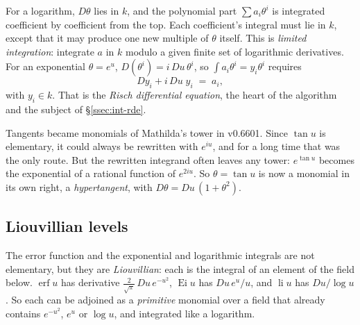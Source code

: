 For a logarithm, \(D\theta\) lies in \(k\), and the polynomial part
\(\sum a_i\theta^i\) is integrated coefficient by coefficient from the top. Each
coefficient's integral must lie in \(k\), except that it may produce one new
multiple of \(\theta\) itself. This is \emph{limited integration}: integrate \(a\) in \(k\) modulo a given finite set of logarithmic
derivatives. For an exponential \(\theta = e^u\), \(D(\theta^i)=i\,Du\,\theta^i\),
so \(\int a_i\theta^i = y_i\theta^i\) requires
\[
  Dy_i + i\,Du\;y_i \;=\; a_i ,
\]
with \(y_i\in k\). That is the \emph{Risch differential equation}, the heart of the
algorithm and the subject of \S\ref{ssec:int-rde}.

Tangents became monomials of Mathilda's tower in v0.6601. Since
\(\tan u\) is elementary, it could always be rewritten with \(e^{iu}\), and for a
long time that was the only route. But the rewritten integrand often leaves any
tower: \(e^{\tan u}\) becomes the exponential of a rational function of \(e^{2iu}\).
So \(\theta=\tan u\) is now a monomial in its own right, a
\emph{hypertangent}, with \(D\theta = Du\,(1+\theta^2)\).

\subsection{Liouvillian levels}
\label{ssec:int-liouvillian}

The error function and the exponential and logarithmic integrals are not
elementary, but they are \emph{Liouvillian}: each is
the integral of an element of the field below. \(\operatorname{erf}u\) has
derivative \(\tfrac{2}{\sqrt\pi}\,Du\,e^{-u^2}\), \(\operatorname{Ei}u\) has
\(Du\,e^u/u\), and \(\operatorname{li}u\) has \(Du/\log u\). So each can be adjoined
as a \emph{primitive} monomial over a field that already contains \(e^{-u^2}\),
\(e^u\) or \(\log u\), and integrated like a logarithm.


